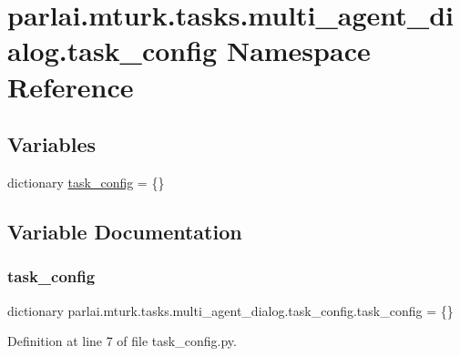 \hypertarget{namespaceparlai_1_1mturk_1_1tasks_1_1multi__agent__dialog_1_1task__config}{}\section{parlai.\+mturk.\+tasks.\+multi\+\_\+agent\+\_\+dialog.\+task\+\_\+config Namespace Reference}
\label{namespaceparlai_1_1mturk_1_1tasks_1_1multi__agent__dialog_1_1task__config}
\subsection*{Variables}
\begin{DoxyCompactItemize}
\item 
dictionary \hyperlink{namespaceparlai_1_1mturk_1_1tasks_1_1multi__agent__dialog_1_1task__config_a3f05cf83a5407e359dff3071053d0cf0}{task\+\_\+config} = \{\}
\end{DoxyCompactItemize}


\subsection{Variable Documentation}
\mbox{\label{namespaceparlai_1_1mturk_1_1tasks_1_1multi__agent__dialog_1_1task__config_a3f05cf83a5407e359dff3071053d0cf0}} 
\subsubsection{\texorpdfstring{task\+\_\+config}{task\_config}}
{\footnotesize\ttfamily dictionary parlai.\+mturk.\+tasks.\+multi\+\_\+agent\+\_\+dialog.\+task\+\_\+config.\+task\+\_\+config = \{\}}



Definition at line 7 of file task\+\_\+config.\+py.

